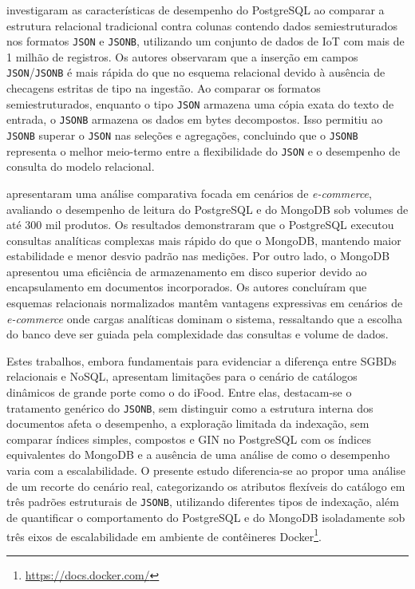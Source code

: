  investigaram as características de desempenho do PostgreSQL ao comparar a estrutura relacional tradicional contra colunas contendo dados semiestruturados nos formatos \texttt{JSON} e \texttt{JSONB}, utilizando um conjunto de dados de IoT com mais de 1 milhão de registros. Os autores observaram que a inserção em campos \texttt{JSON}/\texttt{JSONB} é mais rápida do que no esquema relacional devido à ausência de checagens estritas de tipo na ingestão. Ao comparar os formatos semiestruturados, enquanto o tipo \texttt{JSON} armazena uma cópia exata do texto de entrada, o \texttt{JSONB} armazena os dados em bytes decompostos. Isso permitiu ao \texttt{JSONB} superar o \texttt{JSON} nas seleções e agregações, concluindo que o \texttt{JSONB} representa o melhor meio-termo entre a flexibilidade do \texttt{JSON} e o desempenho de consulta do modelo relacional.

 apresentaram uma análise comparativa focada em cenários de \textit{e-commerce}, avaliando o desempenho de leitura do PostgreSQL e do MongoDB sob volumes de até 300 mil produtos. Os resultados demonstraram que o PostgreSQL executou consultas analíticas complexas mais rápido do que o MongoDB, mantendo maior estabilidade e menor desvio padrão nas medições. Por outro lado, o MongoDB apresentou uma eficiência de armazenamento em disco superior devido ao encapsulamento em documentos incorporados. Os autores concluíram que esquemas relacionais normalizados mantêm vantagens expressivas em cenários de \textit{e-commerce} onde cargas analíticas dominam o sistema, ressaltando que a escolha do banco deve ser guiada pela complexidade das consultas e volume de dados.

Estes trabalhos, embora fundamentais para evidenciar a diferença entre SGBDs relacionais e NoSQL, apresentam limitações para o cenário de catálogos dinâmicos 
de grande porte como o do iFood. Entre elas, destacam-se o tratamento genérico do \texttt{JSONB}, sem distinguir como a estrutura interna dos documentos afeta o desempenho,
a exploração limitada da indexação, sem comparar índices simples, compostos e GIN no PostgreSQL com os índices equivalentes do MongoDB e
a ausência de uma análise de como o desempenho varia com a escalabilidade. O presente estudo diferencia-se ao propor uma análise de um recorte do cenário real, 
categorizando os atributos flexíveis do catálogo em três padrões estruturais de \texttt{JSONB}, utilizando diferentes tipos de indexação, além de quantificar o 
comportamento do PostgreSQL e do MongoDB isoladamente sob três eixos de escalabilidade em ambiente de contêineres Docker\footnote{\url{https://docs.docker.com/}}.


